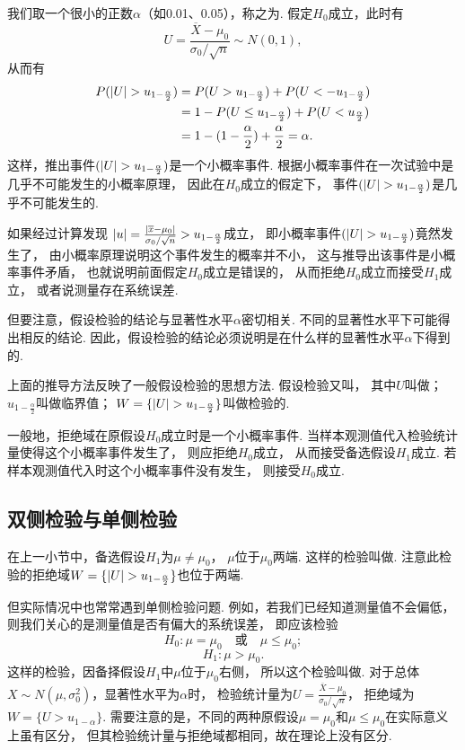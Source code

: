 我们取一个很小的正数\(\alpha\)（如0.01、0.05），称之为.
假定\(H_0\)成立，此时有\[
U = \frac{\overline{X}-\mu_0}{\sigma_0 / \sqrt{n}} \sim N(0,1),
\]从而有\begin{align*}
P(\abs{U}>u_{1-\frac{\alpha}{2}})
&=P(U>u_{1-\frac{\alpha}{2}})+P(U<-u_{1-\frac{\alpha}{2}}) \\
&=1 - P(U \leq u_{1-\frac{\alpha}{2}}) + P(U<u_{\frac{\alpha}{2}}) \\
&=1 - (1-\frac{\alpha}{2}) + \frac{\alpha}{2}
=\alpha.
\end{align*}
这样，推出事件\((\abs{U}>u_{1-\frac{\alpha}{2}})\)是一个小概率事件.
根据小概率事件在一次试验中是几乎不可能发生的小概率原理，
因此在\(H_0\)成立的假定下，
事件\((\abs{U}>u_{1-\frac{\alpha}{2}})\)是几乎不可能发生的.

如果经过计算发现
\(\abs{u}=\frac{\abs{\overline{x}-\mu_0}}{\sigma_0 / \sqrt{n}}>u_{1-\frac{\alpha}{2}}\)成立，
即小概率事件\((\abs{U}>u_{1-\frac{\alpha}{2}})\)竟然发生了，
由小概率原理说明这个事件发生的概率并不小，
这与推导出该事件是小概率事件矛盾，
也就说明前面假定\(H_0\)成立是错误的，
从而拒绝\(H_0\)成立而接受\(H_1\)成立，
或者说测量存在系统误差.

但要注意，假设检验的结论与显著性水平\(\alpha\)密切相关.
不同的显著性水平下可能得出相反的结论.
因此，假设检验的结论必须说明是在什么样的显著性水平\(\alpha\)下得到的.

上面的推导方法反映了一般假设检验的思想方法.
假设检验又叫，
其中\(U\)叫做；
\(u_{1-\frac{\alpha}{2}}\)叫做临界值；
\(W=\{\abs{U}>u_{1-\frac{\alpha}{2}}\}\)叫做检验的.

一般地，拒绝域在原假设\(H_0\)成立时是一个小概率事件.
当样本观测值代入检验统计量使得这个小概率事件发生了，
则应拒绝\(H_0\)成立，
从而接受备选假设\(H_1\)成立.
若样本观测值代入时这个小概率事件没有发生，
则接受\(H_0\)成立.

\subsection{双侧检验与单侧检验}
在上一小节中，备选假设\(H_1\)为\(\mu\neq\mu_0\)，
\(\mu\)位于\(\mu_0\)两端.
这样的检验叫做.
注意此检验的拒绝域\(W=\{\abs{U}>u_{1-\frac{\alpha}{2}}\}\)也位于两端.

但实际情况中也常常遇到单侧检验问题.
例如，若我们已经知道测量值不会偏低，
则我们关心的是测量值是否有偏大的系统误差，
即应该检验\[
	H_0: \mu=\mu_0
	\quad\text{或}\quad
	\mu\leq\mu_0;
\]\[
	H_1: \mu>\mu_0.
\]
这样的检验，因备择假设\(H_1\)中\(\mu\)位于\(\mu_0\)右侧，
所以这个检验叫做.
对于总体\(X \sim N(\mu,\sigma_0^2)\)，显著性水平为\(\alpha\)时，
检验统计量为\(U = \frac{\overline{X}-\mu_0}{\sigma_0 / \sqrt{n}}\)，
拒绝域为\(W=\{U>u_{1-\alpha}\}\).
需要注意的是，不同的两种原假设\(\mu=\mu_0\)和\(\mu\leq\mu_0\)在实际意义上虽有区分，
但其检验统计量与拒绝域都相同，故在理论上没有区分.


